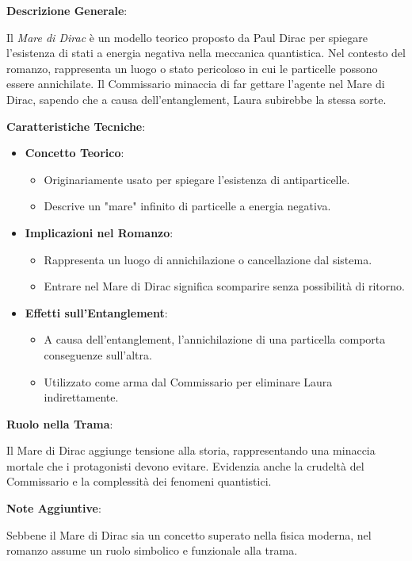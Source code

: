\begin{tcolorbox}[colback=white,colframe=black,title=\textbf{Mare di Dirac}]
\begin{multicols}{2}
\textbf{Descrizione Generale}:

Il \emph{Mare di Dirac} è un modello teorico proposto da Paul Dirac per spiegare l'esistenza di stati a energia negativa nella meccanica quantistica. Nel contesto del romanzo, rappresenta un luogo o stato pericoloso in cui le particelle possono essere annichilate. Il Commissario minaccia di far gettare l'agente nel Mare di Dirac, sapendo che a causa dell'entanglement, Laura subirebbe la stessa sorte.

\textbf{Caratteristiche Tecniche}:

\begin{itemize}
    \item \textbf{Concetto Teorico}:
    \begin{itemize}
        \item Originariamente usato per spiegare l'esistenza di antiparticelle.
        \item Descrive un "mare" infinito di particelle a energia negativa.
    \end{itemize}
    \item \textbf{Implicazioni nel Romanzo}:
    \begin{itemize}
        \item Rappresenta un luogo di annichilazione o cancellazione dal sistema.
        \item Entrare nel Mare di Dirac significa scomparire senza possibilità di ritorno.
    \end{itemize}
    \item \textbf{Effetti sull'Entanglement}:
    \begin{itemize}
        \item A causa dell'entanglement, l'annichilazione di una particella comporta conseguenze sull'altra.
        \item Utilizzato come arma dal Commissario per eliminare Laura indirettamente.
    \end{itemize}
\end{itemize}

\textbf{Ruolo nella Trama}:

Il Mare di Dirac aggiunge tensione alla storia, rappresentando una minaccia mortale che i protagonisti devono evitare. Evidenzia anche la crudeltà del Commissario e la complessità dei fenomeni quantistici.

\textbf{Note Aggiuntive}:

Sebbene il Mare di Dirac sia un concetto superato nella fisica moderna, nel romanzo assume un ruolo simbolico e funzionale alla trama.

\end{multicols}
\end{tcolorbox}

